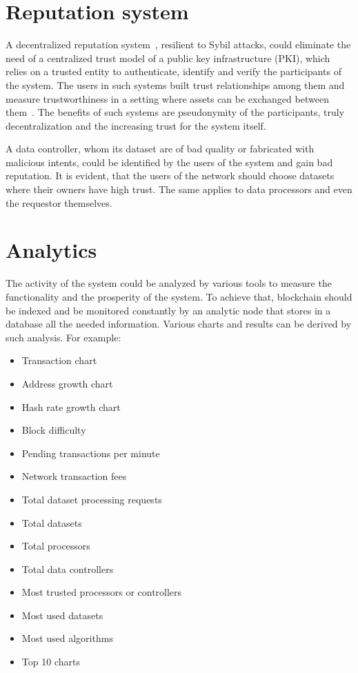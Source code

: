 \section{Reputation system}
\label{future_work:ranking_system}

A decentralized reputation system~\cite{trust_is_risk}, resilient to Sybil attacks, could eliminate the need of a centralized trust model of a public key infrastructure (PKI), which relies on a trusted entity to authenticate, identify and verify the participants of the system. The users in such systems built trust relationships among them and measure trustworthiness in a setting where assets can be exchanged between them~\cite{trust_is_risk}. The benefits of such systems are pseudonymity of the participants, truly decentralization and the increasing trust for the system itself.

A data controller, whom its dataset are of bad quality or fabricated with malicious intents, could be identified by the users of the system and gain bad reputation. It is evident, that the users of the network should choose datasets where their owners have high trust. The same applies to data processors and even the requestor themselves.

\section{Analytics}
\label{future_work:analytics}

The activity of the system could be analyzed by various tools to measure the functionality and the prosperity of the system. To achieve that, blockchain should be indexed and be monitored constantly by an analytic node that stores in a database all the needed information. Various charts and results can be derived by such analysis. For example:

\begin{itemize}
  \item Transaction chart
  \item Address growth chart
  \item Hash rate growth chart
  \item Block difficulty
  \item Pending transactions per minute
  \item Network transaction fees
  \item Total dataset processing requests
  \item Total datasets
  \item Total processors
  \item Total data controllers
  \item Most trusted processors or controllers
  \item Most used datasets
  \item Most used algorithms
  \item Top 10 charts
\end{itemize}

